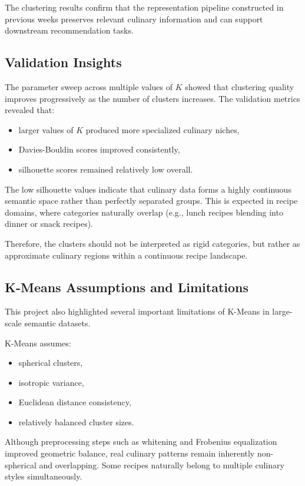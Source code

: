 \documentclass[11pt,a4paper]{article}
\begin{document}
The clustering results confirm that the representation pipeline constructed in previous weeks preserves relevant culinary information and can support downstream recommendation tasks.

\subsection{Validation Insights}

The parameter sweep across multiple values of $K$ showed that clustering quality improves progressively as the number of clusters increases. The validation metrics revealed that:
\begin{itemize}
    \item larger values of $K$ produced more specialized culinary niches,
    \item Davies-Bouldin scores improved consistently,
    \item silhouette scores remained relatively low overall.
\end{itemize}

The low silhouette values indicate that culinary data forms a highly continuous semantic space rather than perfectly separated groups. This is expected in recipe domains, where categories naturally overlap (e.g., lunch recipes blending into dinner or snack recipes).

Therefore, the clusters should not be interpreted as rigid categories, but rather as approximate culinary regions within a continuous recipe landscape.

\subsection{K-Means Assumptions and Limitations}

This project also highlighted several important limitations of K-Means in large-scale semantic datasets.

K-Means assumes:
\begin{itemize}
    \item spherical clusters,
    \item isotropic variance,
    \item Euclidean distance consistency,
    \item relatively balanced cluster sizes.
\end{itemize}

Although preprocessing steps such as whitening and Frobenius equalization improved geometric balance, real culinary patterns remain inherently non-spherical and overlapping. Some recipes naturally belong to multiple culinary styles simultaneously.
\end{document}
